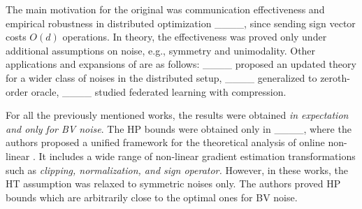 The main motivation for the original  was communication effectiveness and empirical robustness in distributed optimization ____, since sending sign vector costs $O(d)$ operations. In theory, the effectiveness was proved only under additional assumptions on noise, e.g., symmetry and unimodality. Other applications and expansions of  are as follows: 
____ proposed an updated theory for a wider class of noises in the distributed setup, ____ generalized  to zeroth-order oracle, ____ studied federated learning with compression.

For all the previously mentioned works, the results were obtained \textit{in expectation and only for BV noise}. The HP bounds were obtained only in ____, where the authors proposed a unified framework for the theoretical analysis of online non-linear . It includes a wide range of non-linear gradient estimation transformations such as \textit{clipping, normalization, and sign operator.} However, in these works, the HT assumption was relaxed to symmetric noises only. The authors proved HP bounds which are arbitrarily close to the optimal ones for BV noise.